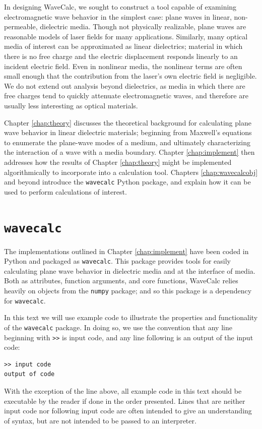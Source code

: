 \documentclass[11pt, reqno]{book}%
\newcounter{ct}
\newcommand{\tw}[1]{{\tt #1}}
\begin{document}
In designing WaveCalc, we sought to construct a tool capable of examining electromagnetic wave behavior in the simplest case: plane waves in linear, non-permeable, dielectric media. Though not physically realizable, plane waves are reasonable models of laser fields for many applications. Similarly, many optical media of interest can be approximated as linear dielectrics; material in which there is no free charge and the electric displacement responds linearly to an incident electric field. Even in nonlinear media, the nonlinear terms are often small enough that the contribution from the laser's own electric field is negligible. We do not extend out analysis beyond dielectrics, as media in which there are free charges tend to quickly attenuate electromagnetic waves, and therefore are usually less interesting as optical materials.

Chapter \ref{chap:theory} discusses the theoretical background for calculating plane wave behavior in linear dielectric materials; beginning from Maxwell's equations to enumerate the plane-wave modes of a medium, and ultimately characterizing the interaction of a wave with a media boundary. Chapter \ref{chap:implement} then addresses how the results of Chapter \ref{chap:theory} might be implemented algorithmically to incorporate into a calculation tool. Chapters \ref{chap:wavecalcobj} and beyond introduce the \tw{wavecalc} Python package, and explain how it can be used to perform calculations of interest.




\section{\tw{wavecalc}}
\label{sec:wavecalcpack}


The implementations outlined in Chapter \ref{chap:implement} have been coded in Python and packaged as \tw{wavecalc}. This package provides tools for easily calculating plane wave behavior in dielectric media and at the interface of media. Both as attributes, function arguments, and core functions, WaveCalc relies heavily on objects from the \tw{numpy} package; and so this package is a dependency for \tw{wavecalc}.

In this text we will use example code to illustrate the properties and functionality of the \tw{wavecalc} package. In doing so, we use the convention that any line beginning with \verb|>>| is input code, and any line following is an output of the input code:
\begin{verbatim}
>> input code
output of code
\end{verbatim}
With the exception of the line above, all example code in this text should be executable by the reader if done in the order presented. Lines that are neither input code nor following input code are often intended to give an understanding of syntax, but are not intended to be passed to an interpreter.
\end{document}
